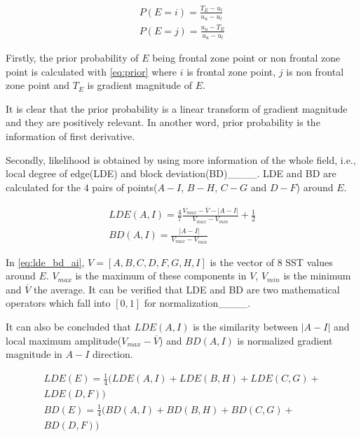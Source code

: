\begin{equation}\label{eq:prior}
	\begin{gathered}
		P(E=i)=\frac{T_E-u_l}{u_u-u_l}\\
		P(E=j)=\frac{u_u-T_E}{u_u-u_l}
	\end{gathered}
\end{equation}

Firstly, the prior probability of $E$ being frontal zone point or non frontal zone point is calculated with \eqref{eq:prior} where $i$ is frontal zone point, $j$ is non frontal zone point and $T_E$ is gradient magnitude of $E$.

It is clear that the prior probability is a linear transform of gradient magnitude and they are positively relevant. In another word, prior probability is the information of first derivative.

Secondly, likelihood is obtained by using more information of the whole field, i.e., local degree of edge(LDE) and block deviation(BD)____. LDE and BD are calculated for the $4$ pairs of points($A-I$, $B-H$, $C-G$ and $D-F$) around $E$. 

\begin{equation}\label{eq:lde_bd_ai}
	\begin{gathered}
		LDE(A,I)=\frac{4}{7}\frac{V_{max}-\overline{V}-|A-I|}{V_{max}-V_{min}}+\frac{1}{2}\\
		BD(A,I)=\frac{|A-I|}{V_{max}-V_{min}}
	\end{gathered}
\end{equation}

In \eqref{eq:lde_bd_ai}, $V=[A, B, C, D, F, G, H, I]$ is the vector of $8$ SST values around $E$. $V_{max}$ is the maximum of these components in $V$, $V_{min}$ is the minimum and $\overline{V}$ the average. It can be verified that LDE and BD are two mathematical operators which fall into $[0, 1]$ for normalization____. 

It can also be concluded that $LDE(A,I)$ is the similarity between $|A-I|$ and local maximum amplitude($V_{max}-\overline{V}$) and $BD(A,I)$ is normalized gradient magnitude in $A-I$ direction.

\begin{equation}\label{eq:lde_bd_e}
	\begin{gathered}
		LDE(E)=\frac{1}{4}(LDE(A,I)+LDE(B,H)+LDE(C,G)+\\
		LDE(D,F))\\
		BD(E)=\frac{1}{4}(BD(A,I)+BD(B,H)+BD(C,G)+\\
		BD(D,F))\\
	\end{gathered}
\end{equation}

